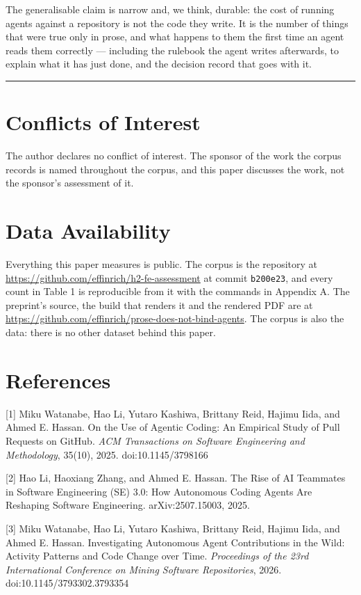 \documentclass[11pt,a4paper]{article}
\begin{document}
The generalisable claim is narrow and, we think, durable: the cost of running agents against a repository is not the code they write. It is the number of things that were true only in prose, and what happens to them the first time an agent reads them correctly --- including the rulebook the agent writes afterwards, to explain what it has just done, and the decision record that goes with it.

\medskip\hrule\medskip

\section*{Conflicts of Interest}

The author declares no conflict of interest. The sponsor of the work the corpus records is named throughout the corpus, and this paper discusses the work, not the sponsor's assessment of it.

\section*{Data Availability}

Everything this paper measures is public. The corpus is the repository at \url{https://github.com/effinrich/h2-fe-assessment} at commit \texttt{b200e23}, and every count in Table 1 is reproducible from it with the commands in Appendix A. The preprint's source, the build that renders it and the rendered PDF are at \url{https://github.com/effinrich/prose-does-not-bind-agents}. The corpus is also the data: there is no other dataset behind this paper.

\section*{References}

[1] Miku Watanabe, Hao Li, Yutaro Kashiwa, Brittany Reid, Hajimu Iida, and Ahmed E. Hassan. \textquotedbl{}On the Use of Agentic Coding: An Empirical Study of Pull Requests on GitHub.\textquotedbl{} \emph{ACM Transactions on Software Engineering and Methodology}, 35(10), 2025. doi:10.1145/3798166

[2] Hao Li, Haoxiang Zhang, and Ahmed E. Hassan. \textquotedbl{}The Rise of AI Teammates in Software Engineering (SE) 3.0: How Autonomous Coding Agents Are Reshaping Software Engineering.\textquotedbl{} arXiv:2507.15003, 2025.

[3] Miku Watanabe, Hao Li, Yutaro Kashiwa, Brittany Reid, Hajimu Iida, and Ahmed E. Hassan. \textquotedbl{}Investigating Autonomous Agent Contributions in the Wild: Activity Patterns and Code Change over Time.\textquotedbl{} \emph{Proceedings of the 23rd International Conference on Mining Software Repositories}, 2026. doi:10.1145/3793302.3793354
\end{document}
